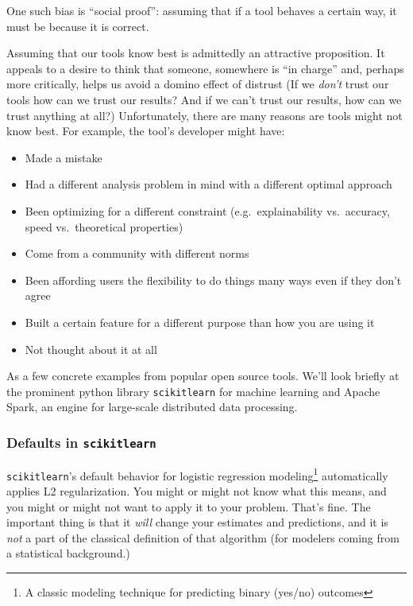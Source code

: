 \documentclass[
]{krantz}
\providecommand{\tightlist}{%
  \setlength{\itemsep}{0pt}\setlength{\parskip}{0pt}}
\begin{document}
One such bias is ``social proof'': assuming that if a tool behaves a certain way, it must be because it is correct.

Assuming that our tools know best is admittedly an attractive proposition. It appeals to a desire to think that someone, somewhere is ``in charge'' and, perhaps more critically, helps us avoid a domino effect of distrust (If we \emph{don't} trust our tools how can we trust our results? And if we can't trust our results, how can we trust anything at all?) Unfortunately, there are many reasons are tools might not know best. For example, the tool's developer might have:

\begin{itemize}
\tightlist
\item
  Made a mistake
\item
  Had a different analysis problem in mind with a different optimal approach
\item
  Been optimizing for a different constraint (e.g.~explainability vs.~accuracy, speed vs.~theoretical properties)
\item
  Come from a community with different norms
\item
  Been affording users the flexibility to do things many ways even if they don't agree
\item
  Built a certain feature for a different purpose than how you are using it
\item
  Not thought about it at all
\end{itemize}

As a few concrete examples from popular open source tools. We'll look briefly at the prominent python library \texttt{scikitlearn} for machine learning and Apache Spark, an engine for large-scale distributed data processing.

\hypertarget{defaults-in-scikitlearn}{%
\subsubsection{\texorpdfstring{Defaults in \texttt{scikitlearn}}{Defaults in scikitlearn}}\label{defaults-in-scikitlearn}}

\texttt{scikitlearn}'s default behavior for logistic regression modeling\footnote{A classic modeling technique for predicting binary (yes/no) outcomes} automatically applies L2 regularization. You might or might not know what this means, and you might or might not want to apply it to your problem. That's fine. The important thing is that it \emph{will} change your estimates and predictions, and it is \emph{not} a part of the classical definition of that algorithm (for modelers coming from a statistical background.)
\end{document}
